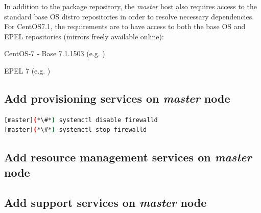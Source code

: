\documentclass[letterpaper]{article}
\newcommand{\baseOS}{CentOS7.1}
\begin{document}

In addition to the \OHPC{} package repository, the {\em master} host also
requires access to the standard base OS distro repositories in order to resolve
necessary dependencies. For \baseOS{}, the requirements are to have access to
both the base OS and EPEL repositories (mirrors freely available online):

\begin{itemize*}
\item CentOS-7 - Base 7.1.1503
  (e.g. \href{http://mirror.centos.org/centos/7.1.1503/os/x86\_64}
             {\color{blue}{http://mirror.centos.org/centos/7.1.1503/os/x86\_64}} )
\item EPEL 7 (e.g. \href{http://download.fedoraproject.org/pub/epel/7/x86\_64}
                        {\color{blue}{http://download.fedoraproject.org/pub/epel/7/x86\_64}} )
\end{itemize*}




\subsection{Add provisioning services on {\em master} node} \label{sec:add_provisioning}



\begin{lstlisting}[language=bash,keywords={}]
[master](*\#*) systemctl disable firewalld
[master](*\#*) systemctl stop firewalld
\end{lstlisting}



\subsection{Add resource management services on {\em master} node} \label{sec:add_rm}


\subsection{Add \InfiniBand{} support services on {\em master} node} \label{sec:add_ofed}
\end{document}
